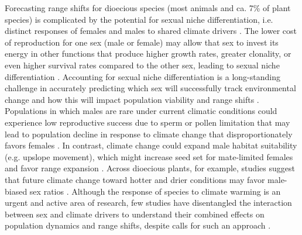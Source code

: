 \documentclass[12pt]{article}\usepackage[]{graphicx}\usepackage[dvipsnames]{xcolor}
\begin{document}
Forecasting range shifts for dioecious species (most animals and ca. 7\% of plant species) is complicated by the potential for sexual niche differentiation, i.e. distinct responses of females and males to shared climate drivers \citep{Tognetti2012,pottier2021sexual,hultine2016climate,morrison2016causes}. 
The lower cost of reproduction for one sex (male or female) may allow that sex to invest its energy in other functions that produce higher growth rates, greater clonality, or even higher survival rates compared to the other sex, leading to sexual niche differentiation \citep{bruijning2017surviving}.
Accounting for sexual niche differentiation is a long-standing challenge in accurately predicting which sex will successfully track environmental change and how this will impact population viability and range shifts \citep{jones1999sex,gissi2023exploring}. 
Populations in which males are rare under current climatic conditions could experience low reproductive success due to sperm or pollen limitation that may lead to population decline in response to climate change that disproportionately favors females \citep{eberhart2017sex}.
In contrast, climate change could expand male habitat suitability (e.g. upslope movement), which might increase seed set for mate-limited females and favor range expansion \citep{petry2016sex}. 
Across dioecious plants, for example, studies suggest that future climate change toward hotter and drier conditions may favor male-biased sex ratios \citep{field2013comparative,hultine2016climate}. 
Although the response of species to climate warming is an urgent and active area of research, few studies have disentangled the interaction between sex and climate drivers to understand their combined effects on population dynamics and range shifts, despite calls for such an approach \citep{hultine2016climate,gissi2023exploring}.
\end{document}
